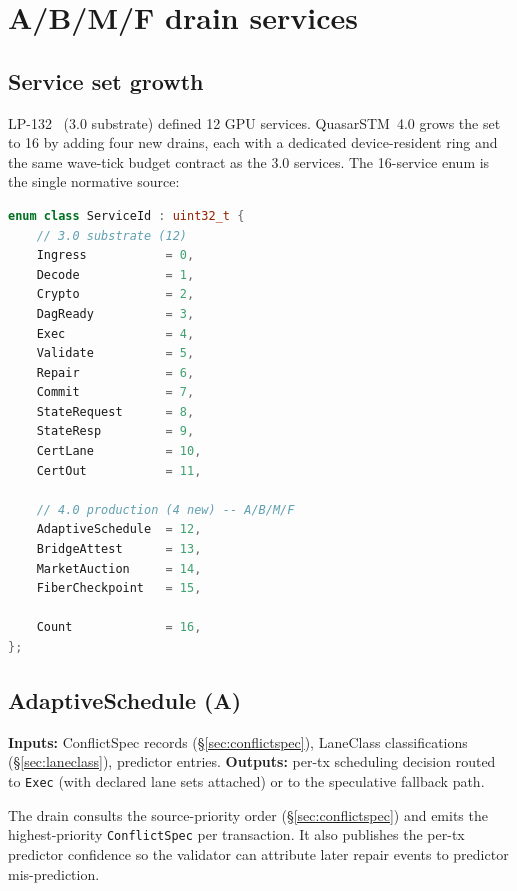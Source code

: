 \section{A/B/M/F drain services}

\label{sec:abmf}

\subsection{Service set growth}

LP-132~\cite{lp132-quasarexec} (3.0 substrate) defined 12 GPU services.
QuasarSTM~4.0 grows the set to 16 by adding four new drains, each with
a dedicated device-resident ring and the same wave-tick budget contract
as the 3.0 services. The 16-service enum is the single normative source:

\begin{lstlisting}[language=C++]
enum class ServiceId : uint32_t {
    // 3.0 substrate (12)
    Ingress           = 0,
    Decode            = 1,
    Crypto            = 2,
    DagReady          = 3,
    Exec              = 4,
    Validate          = 5,
    Repair            = 6,
    Commit            = 7,
    StateRequest      = 8,
    StateResp         = 9,
    CertLane          = 10,
    CertOut           = 11,

    // 4.0 production (4 new) -- A/B/M/F
    AdaptiveSchedule  = 12,
    BridgeAttest      = 13,
    MarketAuction     = 14,
    FiberCheckpoint   = 15,

    Count             = 16,
};
\end{lstlisting}

\subsection{AdaptiveSchedule (A)}

\textbf{Inputs:} ConflictSpec records (\S\ref{sec:conflictspec}),
LaneClass classifications (\S\ref{sec:laneclass}), predictor entries.
\textbf{Outputs:} per-tx scheduling decision routed to
\texttt{Exec} (with declared lane sets attached) or to the speculative
fallback path.

The drain consults the source-priority order
(\S\ref{sec:conflictspec}) and emits the highest-priority
\texttt{ConflictSpec} per transaction. It also publishes the per-tx
predictor confidence so the validator can attribute later repair
events to predictor mis-prediction.


